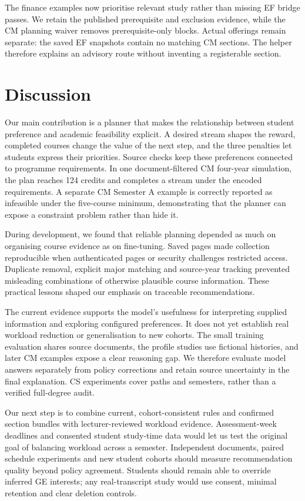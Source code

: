 \documentclass{article}
\begin{document}
The finance examples now prioritise relevant study rather than missing EF bridge passes. We retain the published prerequisite and exclusion evidence\citep{cityu-finance}, while the CM planning waiver removes prerequisite-only blocks. Actual offerings remain separate: the saved EF snapshots contain no matching CM sections. The helper therefore explains an advisory route without inventing a registerable section.

\newpage
\section{Discussion}
Our main contribution is a planner that makes the relationship between student preference and academic feasibility explicit. A desired stream shapes the reward, completed courses change the value of the next step, and the three penalties let students express their priorities. Source checks keep these preferences connected to programme requirements. In one document-filtered CM four-year simulation, the plan reaches 124 credits and completes a stream under the encoded requirements. A separate CM Semester A example is correctly reported as infeasible under the five-course minimum, demonstrating that the planner can expose a constraint problem rather than hide it.

During development, we found that reliable planning depended as much on organising course evidence as on fine-tuning. Saved pages made collection reproducible when authenticated pages or security challenges restricted access. Duplicate removal, explicit major matching and source-year tracking prevented misleading combinations of otherwise plausible course information. These practical lessons shaped our emphasis on traceable recommendations.

The current evidence supports the model's usefulness for interpreting supplied information and exploring configured preferences. It does not yet establish real workload reduction or generalisation to new cohorts. The small training evaluation shares source documents, the profile studies use fictional histories, and later CM examples expose a clear reasoning gap. We therefore evaluate model answers separately from policy corrections and retain source uncertainty in the final explanation. CS experiments cover paths and semesters, rather than a verified full-degree audit.

Our next step is to combine current, cohort-consistent rules and confirmed section bundles with lecturer-reviewed workload evidence. Assessment-week deadlines and consented student study-time data would let us test the original goal of balancing workload across a semester. Independent documents, paired schedule experiments and new student cohorts should measure recommendation quality beyond policy agreement. Students should remain able to override inferred GE interests; any real-transcript study would use consent, minimal retention and clear deletion controls.
\end{document}
